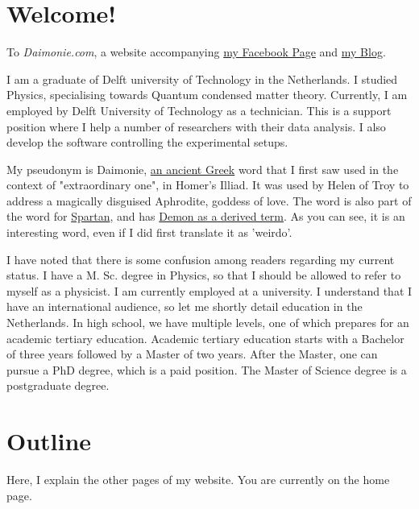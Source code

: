 

\begin{multicols}{2}

\section{Welcome!} 


To \emph{Daimonie.com}, a website accompanying \href{https://www.facebook.com/daimonie}{my Facebook Page} and \href{./blog"}{my Blog}.

I am a graduate of Delft university of Technology in the Netherlands. I studied Physics, specialising towards Quantum condensed matter theory. Currently, I am employed by Delft University of Technology as a technician. This is a support position where I help a number of researchers with their data analysis. I also develop the software controlling the experimental setups.

My pseudonym is Daimonie, \href{https://goo.gl/xwLXc1}{an ancient Greek} word that I first saw used in  the context of "extraordinary one", in Homer's Illiad.  It was used by Helen of Troy to address a magically disguised Aphrodite, goddess of love. The word is also part of the word for \href{https://goo.gl/kktWCr}{Spartan}, and has \href{https://goo.gl/sKxvMo}{Demon as a derived term}. As you can see, it is an interesting word, even if I did first translate it as 'weirdo'.

I have noted that there is some confusion among readers regarding my current status. I have a M. Sc. degree in Physics, so that I should be allowed to refer to myself as a physicist. I am currently employed at a university. I understand that I have an international audience, so let me shortly detail education in the Netherlands. In high school, we have multiple levels, one of which prepares for an academic tertiary education. Academic tertiary education starts with a Bachelor of three years followed by a Master of two years. After the Master, one can pursue a PhD degree, which is a paid position. The Master of Science degree is a postgraduate degree.


\section{Outline}  
Here, I explain the other pages of my website. You are currently on the home page.


\end{multicols}
